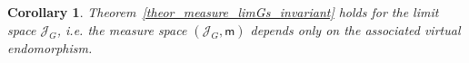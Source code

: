 \documentclass[12pt]{article}
\newcommand{\xmo}{X^{-\omega}}
\newcommand{\limGs}[1][G]{\mathcal{X}_{#1}}
\newcommand{\lims}[1][G]{\mathscr{J}_{#1}}
\newcommand{\si}{\mathsf{s}}
\newcommand{\muls}{\mathsf{m}}
\newcommand{\tile}{\mathscr{T}}
\newcommand{\T}{\mathsf{T}}
\newcommand{\nucl}{\mathcal{N}}
\newtheorem{cor}[theor]{Corollary}
\newtheorem{lemma}{Lemma}
\theoremstyle{definition}
\begin{document}
%





\begin{cor}
Theorem~\ref{theor_measure_limGs_invariant} holds for the limit space $\lims$, i.e. the measure
space $(\lims,\muls)$ depends only on the associated virtual endomorphism.
\end{cor}
\end{document}
